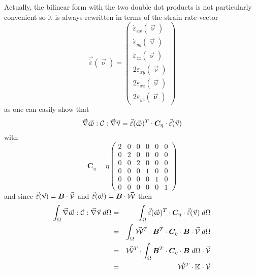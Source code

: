 Actually, the bilinear form with the two double dot products is not particularly convenient so 
it is always rewritten in terms of the strain rate vector
\[
\vec{\dot \varepsilon}(\vec\upnu) = 
\left(
\begin{array}{c}
\dot \varepsilon_{xx}(\vec\upnu) \\
\dot \varepsilon_{yy}(\vec\upnu) \\
\dot \varepsilon_{zz}(\vec\upnu) \\
2\dot \varepsilon_{xy}(\vec\upnu)\\ 
2\dot \varepsilon_{xz}(\vec\upnu)\\
2\dot \varepsilon_{yz}(\vec\upnu) 
\end{array}
\right)
\]
as one can easily show that 
\[
\vec\nabla \vec{\upomega} : {\cal C} : \vec\nabla \vec\upnu = 
\vec{\dot \varepsilon}(\vec\upomega)^T \cdot {\bm C}_\eta \cdot \vec{\dot \varepsilon}(\vec\upnu)
\]
with 
\[
{\bm C}_\eta=
\eta
\left(
\begin{array}{cccccc}
2 & 0 & 0 & 0 & 0 & 0\\
0 & 2 & 0 & 0 & 0 & 0\\
0 & 0 & 2 & 0 & 0 & 0\\ 
0 & 0 & 0 & 1 & 0 & 0\\ 
0 & 0 & 0 & 0 & 1 & 0\\ 
0 & 0 & 0 & 0 & 0 & 1
\end{array}
\right)
\]
and since 
$\vec{\dot \varepsilon}(\vec\upnu) = {\bm B} \cdot \vec{\cal V}$
and
$\vec{\dot \varepsilon}(\vec\upomega) = {\bm B} \cdot \vec{\cal W}$
then
\begin{eqnarray}
\int_\Omega \vec\nabla\vec{\upomega} : {\cal C} : \vec\nabla \vec\upnu  \; d\Omega
&=& \int_\Omega
\vec{\dot \varepsilon}(\vec\upomega)^T \cdot {\bm C}_\eta \cdot \vec{\dot \varepsilon}(\vec\upnu) \; d\Omega \nonumber\\
&=& \int_\Omega
\vec{\cal W}^T \cdot {\bm B}^T \cdot {\bm C}_\eta \cdot {\bm B} \cdot \vec{\cal V} \; d\Omega \nonumber\\ 
&=& \vec{\cal W}^T \cdot \int_\Omega  {\bm B}^T \cdot {\bm C}_\eta \cdot {\bm B}  \; d\Omega \cdot \vec{\cal V} \nonumber\\
&=& \vec{\cal W}^T \cdot \mathbb{K} \cdot \vec{\cal V} 
\end{eqnarray}


